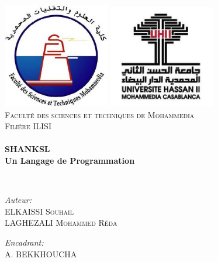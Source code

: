 \begin{titlepage}
\begin{center}

\includegraphics[width=0.35\textwidth]{./LogoFSTM.jpg}
\includegraphics[width=0.35\textwidth]{./univlogo.png}
\\[1cm]

\textsc{\LARGE Faculté des sciences et techniques de Mohammedia}\\[1.5cm]

\textsc{\Large Filiére ILISI }\\[0.5cm]

\HRule \\[0.4cm]

{\huge \bfseries SHANKSL\\
Un Langage de Programmation \\[0.4cm] }

\HRule \\[1.5cm]

\begin{minipage}{0.4\textwidth}
\begin{flushleft} \large
\emph{Auteur:}\\
ELKAISSI \textsc{Souhail}\\
LAGHEZALI \textsc{Mohammed Réda}\\

\end{flushleft}
\end{minipage}
\begin{minipage}{0.4\textwidth}
\begin{flushright} \large
\emph{Encadrant:} \\
A. \textsc{ BEKKHOUCHA}\\


\end{flushright}
\end{minipage}
\end{center}
\end{titlepage}
